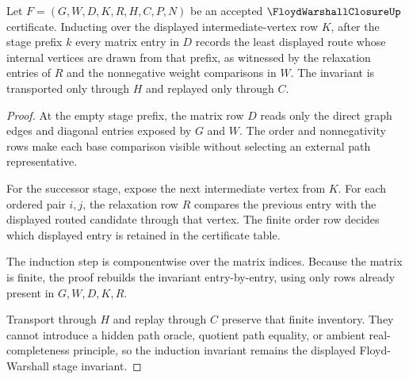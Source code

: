 \begin{theorem}
\label{thm:floyd-warshall-closure-induction-invariant}
Let $F=(G,W,D,K,R,H,C,P,N)$ be an accepted $\FloydWarshallClosureUp$ certificate. Inducting over the displayed intermediate-vertex row $K$, after the stage prefix $k$ every matrix entry in $D$ records the least displayed route whose internal vertices are drawn from that prefix, as witnessed by the relaxation entries of $R$ and the nonnegative weight comparisons in $W$. The invariant is transported only through $H$ and replayed only through $C$.
\end{theorem}
\begin{proof}
At the empty stage prefix, the matrix row $D$ reads only the direct graph edges and diagonal entries exposed by $G$ and $W$. The order and nonnegativity rows make each base comparison visible without selecting an external path representative.

For the successor stage, expose the next intermediate vertex from $K$. For each ordered pair $i,j$, the relaxation row $R$ compares the previous entry with the displayed routed candidate through that vertex. The finite order row decides which displayed entry is retained in the certificate table.

The induction step is componentwise over the matrix indices. Because the matrix is finite, the proof rebuilds the invariant entry-by-entry, using only rows already present in $G,W,D,K,R$.

Transport through $H$ and replay through $C$ preserve that finite inventory. They cannot introduce a hidden path oracle, quotient path equality, or ambient real-completeness principle, so the induction invariant remains the displayed Floyd-Warshall stage invariant.
\end{proof}


